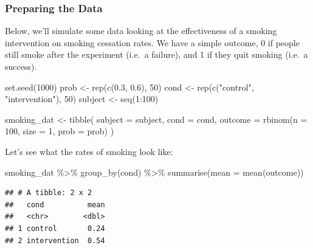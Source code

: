 \documentclass[
]{book}
\newenvironment{Shaded}{\begin{snugshade}}{\end{snugshade}}
\newcommand{\AttributeTok}[1]{\textcolor[rgb]{0.77,0.63,0.00}{#1}}
\newcommand{\DecValTok}[1]{\textcolor[rgb]{0.00,0.00,0.81}{#1}}
\newcommand{\FloatTok}[1]{\textcolor[rgb]{0.00,0.00,0.81}{#1}}
\newcommand{\FunctionTok}[1]{\textcolor[rgb]{0.00,0.00,0.00}{#1}}
\newcommand{\NormalTok}[1]{#1}
\newcommand{\OtherTok}[1]{\textcolor[rgb]{0.56,0.35,0.01}{#1}}
\newcommand{\SpecialCharTok}[1]{\textcolor[rgb]{0.00,0.00,0.00}{#1}}
\newcommand{\StringTok}[1]{\textcolor[rgb]{0.31,0.60,0.02}{#1}}
\begin{document}
\hypertarget{preparing-the-data-2}{%
\subsubsection{Preparing the Data}\label{preparing-the-data-2}}

Below, we'll simulate some data looking at the effectiveness of a smoking intervention on smoking cessation rates. We have a simple outcome, 0 if people still smoke after the experiment (i.e.~a failure), and 1 if they quit smoking (i.e.~a success).

\begin{Shaded}
\begin{Highlighting}[]
\FunctionTok{set.seed}\NormalTok{(}\DecValTok{1000}\NormalTok{)}
\NormalTok{prob }\OtherTok{\textless{}{-}} \FunctionTok{rep}\NormalTok{(}\FunctionTok{c}\NormalTok{(}\FloatTok{0.3}\NormalTok{, }\FloatTok{0.6}\NormalTok{), }\DecValTok{50}\NormalTok{)}
\NormalTok{cond }\OtherTok{\textless{}{-}} \FunctionTok{rep}\NormalTok{(}\FunctionTok{c}\NormalTok{(}\StringTok{"control"}\NormalTok{, }\StringTok{"intervention"}\NormalTok{), }\DecValTok{50}\NormalTok{)}
\NormalTok{subject }\OtherTok{\textless{}{-}} \FunctionTok{seq}\NormalTok{(}\DecValTok{1}\SpecialCharTok{:}\DecValTok{100}\NormalTok{)}

\NormalTok{smoking\_dat }\OtherTok{\textless{}{-}} \FunctionTok{tibble}\NormalTok{(}
  \AttributeTok{subject =}\NormalTok{ subject,}
  \AttributeTok{cond =}\NormalTok{ cond,}
  \AttributeTok{outcome =} \FunctionTok{rbinom}\NormalTok{(}\AttributeTok{n =} \DecValTok{100}\NormalTok{, }\AttributeTok{size =} \DecValTok{1}\NormalTok{, }\AttributeTok{prob =}\NormalTok{ prob)}
\NormalTok{)}
\end{Highlighting}
\end{Shaded}

Let's see what the rates of smoking look like:

\begin{Shaded}
\begin{Highlighting}[]
\NormalTok{smoking\_dat }\SpecialCharTok{\%\textgreater{}\%} \FunctionTok{group\_by}\NormalTok{(cond) }\SpecialCharTok{\%\textgreater{}\%} \FunctionTok{summarise}\NormalTok{(}\AttributeTok{mean =} \FunctionTok{mean}\NormalTok{(outcome))}
\end{Highlighting}
\end{Shaded}

\begin{verbatim}
## # A tibble: 2 x 2
##   cond          mean
##   <chr>        <dbl>
## 1 control       0.24
## 2 intervention  0.54
\end{verbatim}
\end{document}
